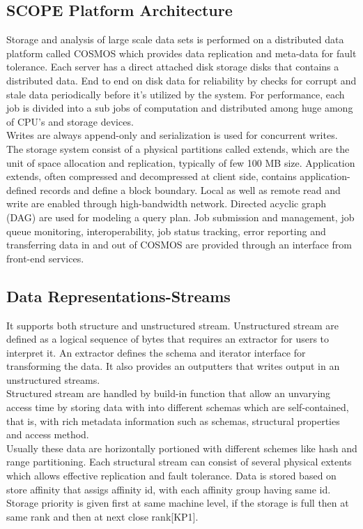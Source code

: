\documentclass[runningheads,a4paper]{llncs}
\begin{document}
\subsection*{SCOPE Platform Architecture}
Storage and analysis of large scale data sets is performed on a distributed data platform called COSMOS which provides data replication and meta-data for fault tolerance. Each server has a direct attached disk storage disks that contains a distributed data. End to end on disk data for reliability by checks for corrupt and stale data periodically before it's utilized by the system. For performance, each job is divided into a sub jobs of computation and distributed among huge among of CPU's and storage devices.\\

Writes are always append-only and serialization is used for concurrent writes. The storage system consist of a physical partitions called extends, which are the unit of space allocation and replication, typically of few 100 MB size. Application extends, often compressed and decompressed at client side, contains application-defined records and define a block boundary. Local as well as remote read and write are enabled through high-bandwidth network. Directed acyclic graph (DAG) are used for modeling a query plan. Job submission and management, job queue monitoring, interoperability, job status tracking, error reporting and transferring data in and out of COSMOS are provided through an interface from front-end services.\\

\subsection*{Data Representations-Streams}
It supports both structure and unstructured stream.
Unstructured stream are defined as a logical sequence of bytes that requires an extractor for users to interpret it. An extractor defines the schema and iterator interface for transforming the data. It also provides an outputters that writes output in an unstructured streams.\\

Structured stream are handled by build-in function that allow an unvarying access time by storing data with into different schemas which are self-contained, that is, with rich metadata information such as schemas, structural properties and access method. \\

Usually these data are horizontally portioned with different schemes like hash and range partitioning. Each structural stream can consist of several physical extents which allows effective replication and fault tolerance. Data is stored based on store affinity that assigs affinity id, with each affinity group having same id. Storage priority is given first at same machine level, if the storage is full then at same rank and then at next close rank[KP1].\\
\end{document}
